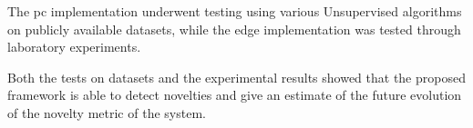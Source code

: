 The \gls{pc} implementation underwent testing using various Unsupervised algorithms on publicly available datasets, while the edge implementation was tested through laboratory experiments.

Both the tests on datasets and the experimental results showed that the proposed framework is able to detect novelties and give an estimate of the future evolution of the novelty metric of the system.